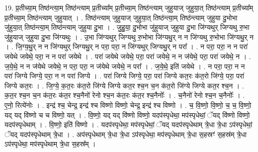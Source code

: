 \documentclass[17pt]{extarticle}
\begin{document}
19. प्र॒तीच्या॒म् तिष्ठ॑न्त्या॒म् तिष्ठ॑न्त्याम् प्र॒तीच्या᳚म् प्र॒तीच्या॒म् तिष्ठ॑न्त्याम् जुहुयाज् जुहुया॒त् तिष्ठ॑न्त्याम् प्र॒तीच्या᳚म् प्र॒तीच्या॒म् तिष्ठ॑न्त्याम् जुहुयात् । . तिष्ठ॑न्त्याम् जुहुयाज् जुहुया॒त् तिष्ठ॑न्त्या॒म् तिष्ठ॑न्त्याम् जुहुया दु॒भोभा जु॑हुया॒त् तिष्ठ॑न्त्या॒म् तिष्ठ॑न्त्याम् जुहुया दु॒भा । . जु॒हु॒या॒ दु॒भोभा जु॑हुयाज् जुहुया दु॒भा जि॑ग्यथुर् जिग्यथु रु॒भा जु॑हुयाज् जुहुया दु॒भा जि॑ग्यथुः । . उ॒भा जि॑ग्यथुर् जिग्यथु रु॒भोभा जि॑ग्यथु॒र् न न जि॑ग्यथु रु॒भोभा जि॑ग्यथु॒र् न । . जि॒ग्य॒थु॒र् न न जि॑ग्यथुर् जिग्यथु॒र् न परा॒ परा॒ न जि॑ग्यथुर् जिग्यथु॒र् न परा᳚ । . न परा॒ परा॒ न न परा॑ जयेथे जयेथे॒ परा॒ न न परा॑ जयेथे । . परा॑ जयेथे जयेथे॒ परा॒ परा॑ जयेथे॒ न न ज॑येथे॒ परा॒ परा॑ जयेथे॒ न । . ज॒ये॒थे॒ न न ज॑येथे जयेथे॒ न परा॒ परा॒ न ज॑येथे जयेथे॒ न परा᳚ । . ज॒ये॒थे॒ इति॑ जयेथे । . न परा॒ परा॒ न न परा॑ जिग्ये जिग्ये॒ परा॒ न न परा॑ जिग्ये । . परा॑ जिग्ये जिग्ये॒ परा॒ परा॑ जिग्ये कत॒रः क॑त॒रो जि॑ग्ये॒ परा॒ परा॑ जिग्ये कत॒रः । . जि॒ग्ये॒ क॒त॒रः क॑त॒रो जि॑ग्ये जिग्ये कत॒र श्च॒न च॒न क॑त॒रो जि॑ग्ये जिग्ये कत॒र श्च॒न । . क॒त॒र श्च॒न च॒न क॑त॒रः क॑त॒र श्च॒नैनो॑ रेनो श्च॒न क॑त॒रः क॑त॒र श्च॒नैनोः᳚ । . च॒नैनो॑ रेनो श्च॒न च॒नैनोः᳚ । . ए॒नो॒ रित्ये॑नोः । . इन्द्र॑ श्च॒ चेन्द्र॒ इन्द्र॑ श्च विष्णो विष्णो॒ चेन्द्र॒ इन्द्र॑ श्च विष्णो । . च॒ वि॒ष्णो॒ वि॒ष्णो॒ च॒ च॒ वि॒ष्णो॒ यद् यद् वि॑ष्णो च च विष्णो॒ यत् । . वि॒ष्णो॒ यद् यद् वि॑ष्णो विष्णो॒ यदप॑स्पृधेथा॒ मप॑स्पृधेथां॒ ॅयद् वि॑ष्णो विष्णो॒ यदप॑स्पृधेथाम् । . वि॒ष्णो॒ इति॑ विष्णो । . यदप॑स्पृधेथा॒ मप॑स्पृधेथां॒ ॅयद् यदप॑स्पृधेथाम् त्रे॒धा त्रे॒धा ऽप॑स्पृधेथां॒ ॅयद् यदप॑स्पृधेथाम् त्रे॒धा । . अप॑स्पृधेथाम् त्रे॒धा त्रे॒धा ऽप॑स्पृधेथा॒ मप॑स्पृधेथाम् त्रे॒धा स॒हस्रꣳ॑ स॒हस्र॑म् त्रे॒धा ऽप॑स्पृधेथा॒ मप॑स्पृधेथाम् त्रे॒धा स॒हस्र᳚म् । \newline
\end{document}
